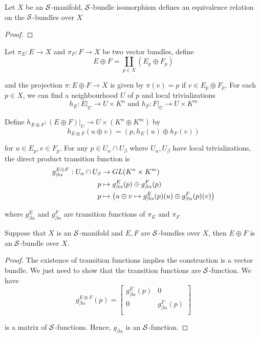 \begin{proposition}
	Let $X$ be an $\Str$-manifold, $\Str$-bundle isomorphism defines an equivalence relation on the $\Str$-bundles over $X$
	\begin{proof}
	\end{proof}
\end{proposition}

\begin{definition}
	Let $\pi_E: E \to X$ and $\pi_F: F \to X$ be two vector bundles, define
	$$
	E \oplus F = \coprod_{p \in X} (E_p \oplus F_p)
	$$
	
	and the projection $\pi: E \oplus F \to X$ is given by $\pi(v) = p$ if $v \in E_p \oplus F_p$. For each $p \in X$, we can find a neighbourhood $U$ of $p$ and local trivializations
	$$
	h_E: E\vert_U \to U \times K^n \text{ and } h_F: F\vert_U \to U \times K^m
	$$
	
	Define $h_{E \oplus F}: (E \oplus F) \vert_U \to U \times (K^n \oplus K^m)$ by
	$$
	h_{E \oplus F}(u \oplus v) = (p, h_E(u) \oplus h_F(v))
	$$
	
	for $u \in E_p, v \in F_p$. For any $p \in U_\alpha \cap U_\beta$ where $U_\alpha, U_\beta$ have local trivializations, the direct product transition function is
	\begin{align*}
		g_{\beta \alpha}^{E \oplus F}: U_\alpha \cap U_\beta &\to GL(K^n \times K^m) \\
		p &\mapsto g_{\beta \alpha}^{E}(p) \oplus g_{\beta \alpha}^{F}(p) \\
		p &\mapsto \tuple*{u \oplus v \mapsto g_{\beta \alpha}^E(p)(u) \oplus g_{\beta \alpha}^F(p)(v)}
	\end{align*}
	
	where $g_{\beta \alpha}^{E}$ and $g_{\beta \alpha}^{F}$ are transition functions of $\pi_E$ and $\pi_F$
\end{definition}

\begin{proposition}
	Suppose that $X$ is an $\Str$-manifold and $E, F$ are $\Str$-bundles over $X$, then $E \oplus F$ is an $\Str$-bundle over $X$.
	
	\begin{proof}
		The existence of transition functions implies the construction is a vector bundle. We just need to show that the transition functions are $\Str$-function. We have
		$$
		g_{\beta \alpha}^{E \oplus F}(p) = \begin{bmatrix}
			g_{\beta \alpha}^E(p) & 0 \\
			0 & g_{\beta \alpha}^F(p) \\
		\end{bmatrix}
		$$
		
		is a matrix of $\Str$-functions. Hence, $g_{\beta \alpha}$ is an $\Str$-function.
	\end{proof}
\end{proposition}



